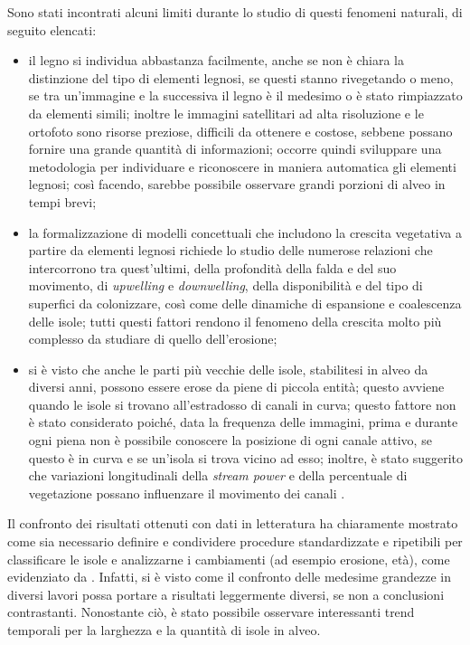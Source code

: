 Sono stati incontrati alcuni limiti durante lo studio di questi fenomeni naturali, di seguito elencati:
%
\begin{itemize}
	\item il legno si individua abbastanza facilmente, anche se non è chiara la distinzione del tipo di elementi legnosi, se questi stanno rivegetando o meno, se tra un'immagine e la successiva il legno è il medesimo o è stato rimpiazzato da elementi simili;
	inoltre le immagini satellitari ad alta risoluzione e le ortofoto sono risorse preziose, difficili da ottenere e costose, sebbene possano fornire una grande quantità di informazioni;
	occorre quindi sviluppare una metodologia per individuare e riconoscere in maniera automatica gli elementi legnosi; così facendo, sarebbe possibile osservare grandi porzioni di alveo in tempi brevi;
	\item la formalizzazione di modelli concettuali che includono la crescita vegetativa a partire da elementi legnosi richiede lo studio delle numerose relazioni che intercorrono tra quest'ultimi, della profondità della falda e del suo movimento, di \emph{upwelling} e \emph{downwelling}, della disponibilità e del tipo di superfici da colonizzare, così come delle dinamiche di espansione e coalescenza delle isole;
	tutti questi fattori rendono il fenomeno della crescita molto più complesso da studiare di quello dell'erosione;
	\item si è visto che anche le parti più vecchie delle isole, stabilitesi in alveo da diversi anni, possono essere erose da piene di piccola entità;
	questo avviene quando le isole si trovano all'estradosso di canali in curva;
	questo fattore non è stato considerato poiché, data la frequenza delle immagini, prima e durante ogni piena non è possibile conoscere la posizione di ogni canale attivo, se questo è in curva e se un'isola si trova vicino ad esso;
	inoltre, è stato suggerito che variazioni longitudinali della \emph{stream power} e della percentuale di vegetazione possano influenzare il movimento dei canali .
\end{itemize}
%

Il confronto dei risultati ottenuti con dati in letteratura ha chiaramente mostrato come sia necessario definire e condividere procedure standardizzate e ripetibili per classificare le isole e analizzarne i cambiamenti (ad esempio erosione, età), come evidenziato da .
Infatti, si è visto come il confronto delle medesime grandezze in diversi lavori possa portare a risultati leggermente diversi, se non a conclusioni contrastanti.
Nonostante ciò, è stato possibile osservare interessanti trend temporali per la larghezza e la quantità di isole in alveo.

